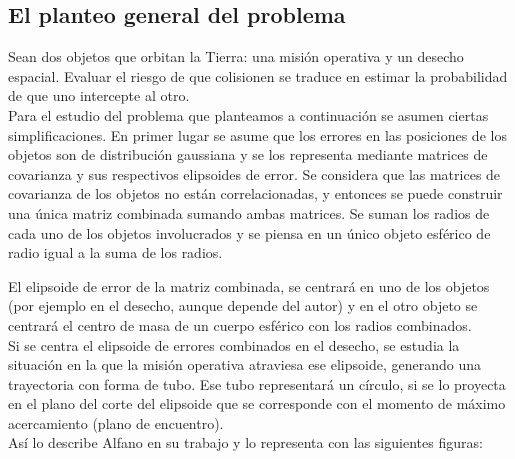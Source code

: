 \subsection{El planteo general del problema}
Sean dos objetos que orbitan la Tierra: una misi\'on operativa y un desecho espacial. Evaluar el riesgo de que colisionen se traduce en estimar la probabilidad de que uno intercepte al otro.\\

Para el estudio del problema que planteamos a continuaci\'on se asumen ciertas simplificaciones. En primer lugar se asume que los errores en las posiciones de los objetos son de distribuci\'on gaussiana y se los representa mediante matrices de covarianza y sus respectivos elipsoides de error. Se considera que las matrices de covarianza de los objetos no est\'an correlacionadas, y entonces se puede construir una \'unica matriz combinada sumando ambas matrices. Se suman los radios de cada uno de los objetos involucrados  y se piensa en un \'unico objeto esf\'erico de radio igual a la suma de los radios. 

El elipsoide de error de la matriz combinada, se centrar\'a en uno de los objetos (por ejemplo en el desecho, aunque depende del autor) y en el otro objeto se centrar\'a el centro de masa de un cuerpo esf\'erico con los radios combinados. \\

Si se centra el elipsoide de errores combinados en el desecho, se estudia la situaci\'on en la que la misi\'on operativa atraviesa ese elipsoide, generando una trayectoria con forma de tubo. Ese tubo representar\'a un c\'irculo, si se lo proyecta en el plano del corte del elipsoide que se corresponde con el momento de m\'aximo acercamiento (plano de encuentro).\\

As\'i lo describe Alfano en su trabajo \citep{alfano2007review} y lo representa con las siguientes figuras:\\



